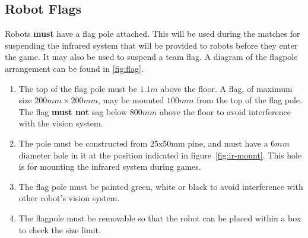 \subsection{Robot Flags}
\label{sub:Flags}

Robots \textbf{must} have a flag pole attached.  This will be used during the matches for suspending the infrared system that will be provided to robots before they enter the game.  It may also be used to suspend a team flag.  A diagram of the flagpole arrangement can be found in \autoref{fig:flag}.

\begin{enumerate}
\item The top of the flag pole must be $1.1m$ above the floor.  A flag, of maximum size $200mm \times 200mm$, may be mounted $100mm$ from the top of the flag pole.  The flag \textbf{must not} sag below $800mm$ above the floor to avoid interference with the vision system.

\item The pole must be constructed from 25x50mm pine, and must have a $6mm$ diameter hole in it at the position indicated in figure~\ref{fig:ir-mount}.  This hole is for mounting the infrared system during games.

\item The flag pole must be painted green, white or black to avoid interference with other robot's vision system.

\item The flagpole must be removable so that the robot can be placed within a box to check the size limit.
\end{enumerate}

